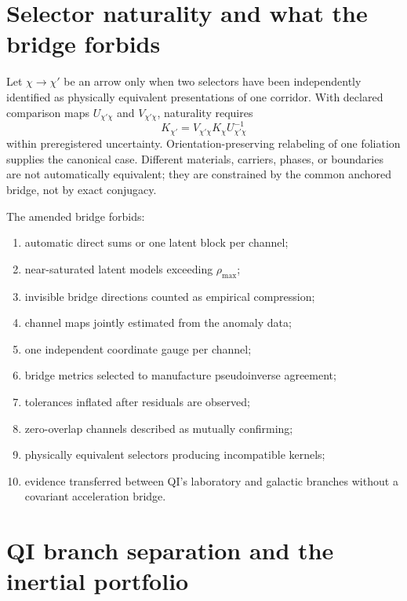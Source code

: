\documentclass[11pt]{article}
\begin{document}
\section{Selector naturality and what the bridge forbids}
\label{sec:naturality}

Let \(\chi\to\chi'\) be an arrow only when two selectors have been independently identified as physically equivalent presentations of one corridor. With declared comparison maps \(U_{\chi'\chi}\) and \(V_{\chi'\chi}\), naturality requires
\begin{equation}
K_{\chi'}
=V_{\chi'\chi}K_{\chi}U_{\chi'\chi}^{-1}
\label{eq:naturality}
\end{equation}
within preregistered uncertainty. Orientation-preserving relabeling of one foliation supplies the canonical case. Different materials, carriers, phases, or boundaries are not automatically equivalent; they are constrained by the common anchored bridge, not by exact conjugacy.

The amended bridge forbids:
\begin{enumerate}[leftmargin=1.55em]
\item automatic direct sums or one latent block per channel;
\item near-saturated latent models exceeding \(\rho_{\max}\);
\item invisible bridge directions counted as empirical compression;
\item channel maps jointly estimated from the anomaly data;
\item one independent coordinate gauge per channel;
\item bridge metrics selected to manufacture pseudoinverse agreement;
\item tolerances inflated after residuals are observed;
\item zero-overlap channels described as mutually confirming;
\item physically equivalent selectors producing incompatible kernels;
\item evidence transferred between QI's laboratory and galactic branches without a covariant acceleration bridge.
\end{enumerate}

\section{QI branch separation and the inertial portfolio}
\label{sec:qi_branches}
\end{document}
